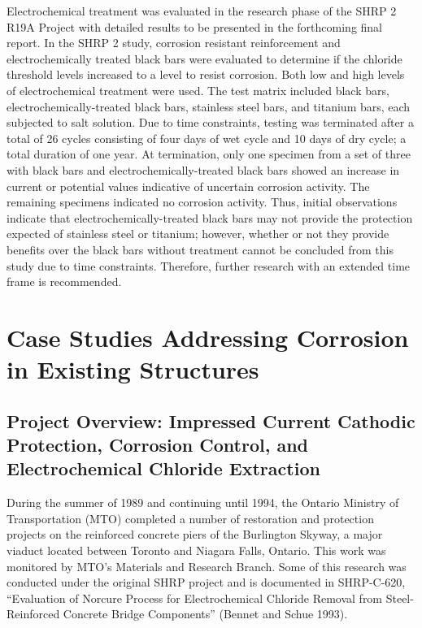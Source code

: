 Electrochemical treatment was evaluated in the research phase of the SHRP 2 R19A Project with detailed results to be presented in the forthcoming final report. In the SHRP 2 study, corrosion resistant reinforcement and electrochemically treated black bars were evaluated to determine if the chloride threshold levels increased to a level to resist corrosion. Both low and high levels of electrochemical treatment were used. The test matrix included black bars, electrochemically-treated black bars, stainless steel bars, and titanium bars, each subjected to salt solution. Due to time constraints, testing was terminated after a total of 26 cycles consisting of four days of wet cycle and 10 days of dry cycle; a total duration of one year. At termination, only one specimen from a set of three with black bars and electrochemically-treated black bars showed an increase in current or potential values indicative of uncertain corrosion activity. The remaining specimens indicated no corrosion activity. Thus, initial observations indicate that electrochemically-treated black bars may not provide the protection expected of stainless steel or titanium; however, whether or not they provide benefits over the black bars without treatment cannot be concluded from this study due to time constraints. Therefore, further research with an extended time frame is recommended.

\section{Case Studies Addressing Corrosion in Existing Structures}
\label{sec:case-study-addressing-corrosion}
\subsection{Project Overview: Impressed Current Cathodic Protection, Corrosion Control, and Electrochemical Chloride Extraction}
During the summer of 1989 and continuing until 1994, the Ontario Ministry of Transportation (MTO) completed a number of restoration and protection projects on the reinforced concrete piers of the Burlington Skyway, a major viaduct located between Toronto and Niagara Falls, Ontario. This work was monitored by MTO’s Materials and Research Branch. Some of this research was conducted under the original SHRP project and is documented in SHRP-C-620, “Evaluation of Norcure Process for Electrochemical Chloride Removal from Steel-Reinforced Concrete Bridge Components” (Bennet and Schue 1993).

